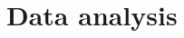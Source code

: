 \documentclass[10pt]{article} %
\theoremstyle{break}
\begin{document}
\pagebreak


\section{Data analysis}




















\pagebreak



\end{document}
